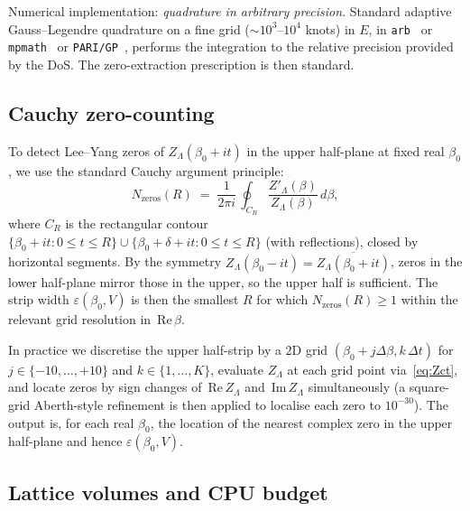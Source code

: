 \documentclass[11pt,a4paper]{article}
\theoremstyle{definition}
\theoremstyle{remark}
\newcommand{\sgnIm}{\,\mathrm{Im}\,}
\newcommand{\sgnRe}{\,\mathrm{Re}\,}
\begin{document}
Numerical implementation: \emph{quadrature in arbitrary precision}.
Standard adaptive Gauss--Legendre quadrature on a fine grid
($\sim 10^3$--$10^4$ knots) in $E$, in
\texttt{arb}~\cite{ArbBeta} or \texttt{mpmath}~\cite{Mpmath} or
\texttt{PARI/GP}~\cite{PARI}, performs the integration to the
relative precision provided by the DoS. The
zero-extraction prescription is then standard.

\subsection{Cauchy zero-counting}\label{sec:cauchy}

To detect Lee--Yang zeros of $Z_\Lambda(\beta_0 + it)$ in the
upper half-plane at fixed real $\beta_0$, we use the standard
Cauchy argument principle:
\begin{equation}
N_{\mathrm{zeros}}(R) \;=\; \frac{1}{2\pi i}\,
\oint_{C_R} \frac{Z'_\Lambda(\beta)}{Z_\Lambda(\beta)}\, d\beta,
\label{eq:cauchy}
\end{equation}
where $C_R$ is the rectangular contour
$\{\beta_0 + i t : 0 \le t \le R\} \cup
\{\beta_0 + \delta + i t : 0 \le t \le R\}$ (with reflections),
closed by horizontal segments. By the symmetry
$Z_\Lambda(\beta_0 - it) = \overline{Z_\Lambda(\beta_0 + it)}$,
zeros in the lower half-plane mirror those in the upper, so the
upper half is sufficient. The strip width
$\varepsilon(\beta_0, V)$ is then the smallest $R$ for which
$N_{\mathrm{zeros}}(R) \ge 1$ within the relevant grid resolution
in $\sgnRe \beta$.

In practice we discretise the upper half-strip by a $2$D grid
$(\beta_0 + j \Delta\beta, k\, \Delta t)$ for
$j \in \{-10, \ldots, +10\}$ and $k \in \{1, \ldots, K\}$, evaluate
$Z_\Lambda$ at each grid point via~\eqref{eq:Zct}, and locate zeros
by sign changes of $\sgnRe Z_\Lambda$ and $\sgnIm Z_\Lambda$
simultaneously (a square-grid Aberth-style refinement is then
applied to localise each zero to $10^{-30}$). The output is, for
each real $\beta_0$, the location of the nearest complex zero in
the upper half-plane and hence $\varepsilon(\beta_0, V)$.

\subsection{Lattice volumes and CPU budget}\label{sec:cputime}
\end{document}
